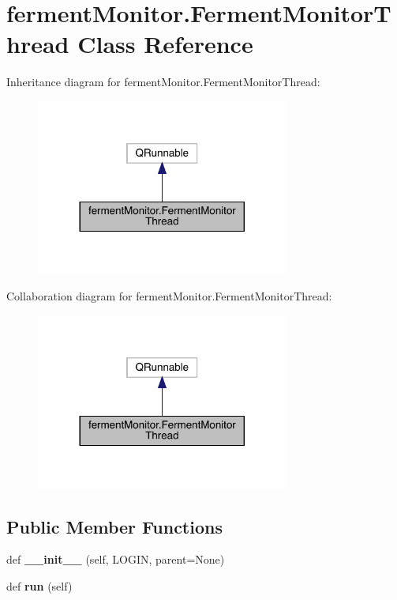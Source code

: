 \hypertarget{classferment_monitor_1_1_ferment_monitor_thread}{}\section{ferment\+Monitor.\+Ferment\+Monitor\+Thread Class Reference}
\label{classferment_monitor_1_1_ferment_monitor_thread}


Inheritance diagram for ferment\+Monitor.\+Ferment\+Monitor\+Thread\+:\nopagebreak
\begin{figure}[H]
\begin{center}
\leavevmode
\includegraphics[width=236pt]{classferment_monitor_1_1_ferment_monitor_thread__inherit__graph}
\end{center}
\end{figure}


Collaboration diagram for ferment\+Monitor.\+Ferment\+Monitor\+Thread\+:\nopagebreak
\begin{figure}[H]
\begin{center}
\leavevmode
\includegraphics[width=236pt]{classferment_monitor_1_1_ferment_monitor_thread__coll__graph}
\end{center}
\end{figure}
\subsection*{Public Member Functions}
\begin{DoxyCompactItemize}
\item 
\mbox{\label{classferment_monitor_1_1_ferment_monitor_thread_afda8cf5659352ea0311684454b33243b}} 
def {\bfseries \+\_\+\+\_\+init\+\_\+\+\_\+} (self, L\+O\+G\+IN, parent=None)
\item 
\mbox{\label{classferment_monitor_1_1_ferment_monitor_thread_a250b2b8eece530b226489b7d63be1b18}} 
def {\bfseries run} (self)
\end{DoxyCompactItemize}
